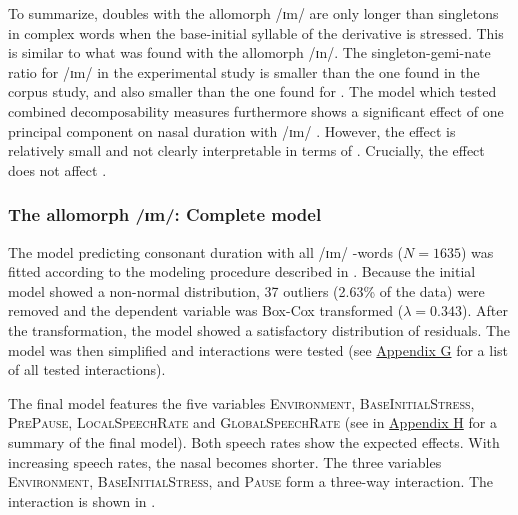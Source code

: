 To summarize,  doubles with the allomorph /ɪm/  are only longer than singletons in complex words when the base-initial syllable of the derivative is stressed. This is similar to what was found with the allomorph /ɪn/. The singleton-gemi-nate ratio for /ɪm/  in the experimental study is smaller than the one found in the corpus study, and also smaller than the one found for . 
The model which tested combined decomposability measures furthermore shows a significant effect of one principal component on nasal duration with /ɪm/ . However, the effect is relatively small and not clearly interpretable in terms of . Crucially, the effect does not affect .




\subsubsection{The allomorph /ɪm/: Complete model}

The model predicting consonant duration with all /ɪm/ -words ($N=1635$) was fitted according to the modeling procedure described in .  Because the initial model showed a non-normal distribution,  37 outliers (2.63\% of the data) were removed and the dependent variable was Box-Cox transformed ($\lambda = 0.343$). 
After the transformation, the model showed a satisfactory distribution of residuals. The model was then simplified and interactions were tested (see \hyperref[Appendix G Summaries of tested interactions in experimental study]{Appendix G} for a list of all tested interactions). 

 
The final model features the five variables \textsc{Environment}, \textsc{BaseInitialStress}, \textsc{PrePause}, \textsc{LocalSpeechRate} and \textsc{GlobalSpeechRate} (see  in \hyperref[Appendix H: Model Summaries Experiment]{Appendix H} for a summary of the final model). Both speech rates show the expected effects. With increasing speech rates, the nasal becomes shorter. The three variables \textsc{Environment}, \textsc{BaseInitialStress}, and \textsc{Pause} form a three-way interaction. The interaction is shown in .

